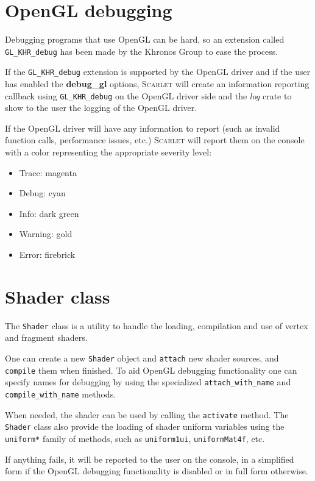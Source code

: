 \documentclass[11pt,a4paper]{report}
\begin{document}
\section{OpenGL debugging}
Debugging programs that use OpenGL can be hard, so an extension called \texttt{GL\_KHR\_debug} has been made by the Khronos Group to ease the process.

If the \texttt{GL\_KHR\_debug} extension is supported by the OpenGL driver and if the user has enabled the \textbf{debug\_gl} options, \textsc{Scarlet} will create an information reporting callback using \texttt{GL\_KHR\_debug} on the OpenGL driver side and the \textit{log} crate to show to the user the logging of the OpenGL driver.

If the OpenGL driver will have any information to report (such as invalid function calls, performance issues, etc.) \textsc{Scarlet} will report them on the console with a color representing the appropriate severity level:
\begin{itemize}
	\item Trace: {\color{magenta}magenta}
	\item Debug: {\color{cyan}cyan}
	\item Info: {\color{DarkGreen}dark green}
	\item Warning: {\color{Gold}gold}
	\item Error: {\color{FireBrick}firebrick}
\end{itemize}

\section{Shader class}
The \texttt{Shader} class is a utility to handle the loading, compilation and use of vertex and fragment shaders.

One can create a new \texttt{Shader} object and \texttt{attach} new shader sources, and \texttt{compile} them when finished. To aid OpenGL debugging functionality one can specify names for debugging by using the specialized \texttt{attach\_with\_name} and \texttt{compile\_with\_name} methods.

When needed, the shader can be used by calling the \texttt{activate} method. The \texttt{Shader} class also provide the loading of shader uniform variables using the \texttt{uniform*} family of methods, such as \texttt{uniform1ui}, \texttt{uniformMat4f}, etc.

If anything fails, it will be reported to the user on the console, in a simplified form if the OpenGL debugging functionality is disabled or in full form otherwise.
\end{document}
